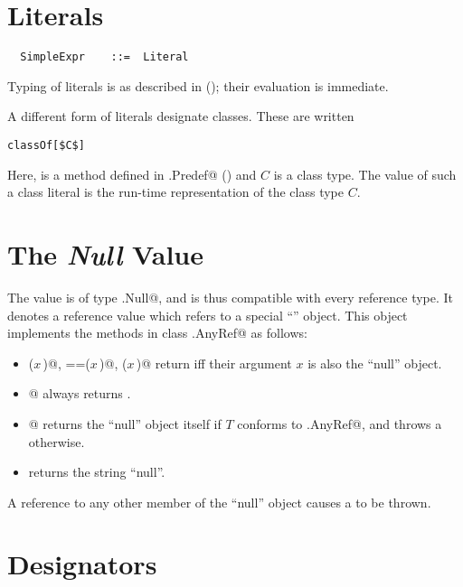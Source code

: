 \section{Literals}\label{sec:literal-exprs}

\syntax\begin{lstlisting}
  SimpleExpr    ::=  Literal
\end{lstlisting}

Typing of literals is as described in (); their
evaluation is immediate.

A different form of literals designate classes. These are written 
\begin{lstlisting}
classOf[$C$]
\end{lstlisting}
Here, \lstinline@classOf@ is a method defined in \lstinline@scala.Predef@
() and $C$ is a class type. The value of such a class literal is the
run-time representation of the class type $C$.

\section{The {\em Null} Value}

The  value is of type \lstinline@scala.Null@, and is thus
compatible with every reference type.  It denotes a reference value
which refers to a special ``\lstinline@null@'' object. This object
implements the methods in class \lstinline@scala.AnyRef@ as follows:
\begin{itemize}
\item
\lstinline@eq($x\,$)@, \lstinline@==($x\,$)@, \lstinline@equals($x\,$)@ return  iff their
argument $x$ is also the ``null'' object.
\item
\lstinline@isInstanceOf[$T\,$]@ always returns .
\item
\lstinline@asInstanceOf[$T\,$]@ returns the ``null'' object itself if
$T$ conforms to \lstinline@scala.AnyRef@, and throws a
\lstinline@NullPointerException@ otherwise.
\item
{} returns the string ``null''.
\end{itemize}
A reference to any other member of the ``null'' object causes a
 to be thrown. 

\section{Designators}
\label{sec:designators}

